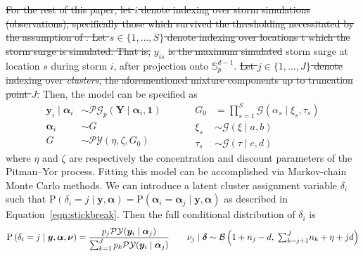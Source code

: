 \st{For the rest of this paper, let $i$ denote indexing over storm simulations (observations), 
    specifically those which survived the thresholding necessitated by the assumption of 
    .  Let $s \in \lbrace 1, \ldots, S\rbrace$ denote indexing 
    over locations t which the storm surge is simulated.  That is,}  $y_{is}$ \st{is the maximum 
    simulated} 
    storm surge at location $s$ during storm $i$, after projection onto $\mathbb{S}_p^{d-1}$.
    \st{Let $j\in \lbrace 1,\ldots,J\rbrace$ denote indexing over \emph{clusters}, the aforementioned
    mixture components up to truncation point $J$.}  Then, the model can be specified as
    \begin{equation}
        \label{eqn:pypg}
        \begin{aligned}
            \bm{y}_i \mid \bm{\alpha}_i &\sim
                \mathcal{PG}_p\left(\bm{Y}\mid\bm{\alpha}_i,\bm{1}\right)\\
            \bm{\alpha}_i &\sim G\\
            G &\sim \mathcal{PY}\left(\eta, \zeta, G_0\right)        
        \end{aligned}
        ~\hspace{1cm}
        \begin{aligned}
            G_0 &= {\textstyle\prod}_{s = 1}^{S}\mathcal{G}(\alpha_{s}\mid \xi_{s},\tau_{s})\\
            \xi_{s} &\sim \mathcal{G}(\xi\mid a, b)\\
            \tau_{s} &\sim \mathcal{G}(\tau\mid c, d)
        \end{aligned} 
    \end{equation}
    where $\eta$ and $\zeta$ are respectively the concentration and discount parameters
    of the Pitman--Yor process.  Fitting this model can be accomplished via Markov-chain 
    Monte Carlo methods. We can introduce a latent cluster assignment variable $\delta_i$ 
    such that 
    $\text{P}\left(\delta_i = j\mid\bm{y},\bm{\alpha}\right) = 
        \text{P}\left(\bm{\alpha}_i = \bm{\alpha}_j\mid \bm{y},\bm{\alpha}\right)$ as described in 
        Equation~\eqref{eqn:stickbreak}.
    Then the full conditional distribution of $\delta_i$ is
    \begin{equation}
        \label{eqn:pdelta}
        \text{P}\left(\delta_i = j\mid \bm{y},\bm{\alpha},\bm{\nu}\right) = 
            \frac{p_j\mathcal{PY}(\bm{y}_i\mid\bm{\alpha}_j)}{
                \sum_{k = 1}^J p_k\mathcal{PY}(\bm{y}_i\mid\bm{\alpha}_j)}
                \;\hspace{0.5cm}\;
            \nu_j\mid\bm{\delta} \sim \mathcal{B}\left(1 + n_j - d,\; 
                            {\textstyle \sum}_{k = j+1}^J n_k + \eta + jd\right)
    \end{equation}
